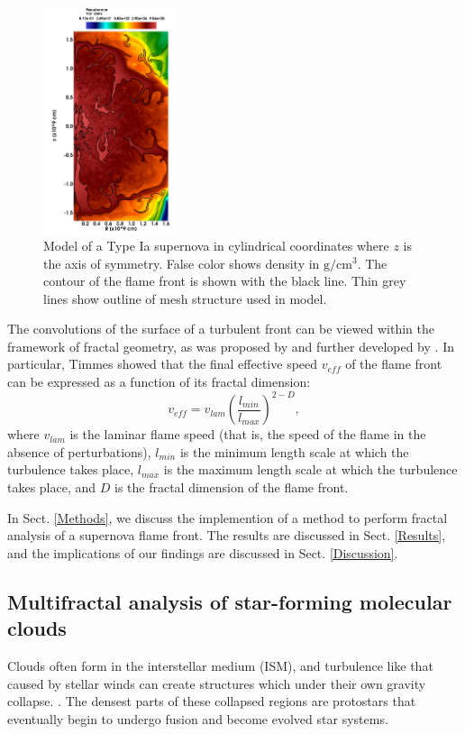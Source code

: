 \documentclass[iop]{emulateapj}
\begin{document}
\begin{figure}[ht]
	\begin{center}
	\includegraphics[width=0.35\textwidth,clip=true]{Graphics/n7d1r10t15b0011_cropped.png}
	\caption{Model of a Type Ia supernova in cylindrical coordinates where $z$ is the axis of symmetry. False color shows density in $\mathrm{g/cm^3}$. The contour of the flame front is shown with the black line. Thin grey lines show outline of mesh structure used in model.
	\label{f:flamefrontwithcontour}}
	\end{center}
	\end{figure} 

The convolutions of the surface of a turbulent front can be viewed within the framework of fractal geometry, as was proposed by \cite{Mandelbrot1975} and further developed by \cite{Timmes1994}. In particular, Timmes showed that the final effective speed $v_{eff}$ of the flame front can be expressed as a function of its fractal dimension:
\begin{equation} 
	v_{eff} = v_{lam} \left(\frac{l_{min}}{l_{max}}\right)^{2 - D},
\end{equation}
where $v_{lam}$ is the laminar flame speed (that is, the speed of the flame in the absence of perturbations), $l_{min}$ is the minimum length scale at which the turbulence takes place, $l_{max}$ is the maximum length scale at which the turbulence takes place, and $ D $ is the fractal dimension of the flame front.

In Sect. \ref{Methods}, we discuss the implemention of a method to perform fractal analysis of a supernova flame front. The results are discussed in Sect. \ref{Results}, and the implications of our findings are discussed in Sect. \ref{Discussion}.

\subsection{Multifractal analysis of star-forming molecular clouds}
Clouds often form in the interstellar medium (ISM), and turbulence like that caused by stellar winds can create structures which under their own gravity collapse. \citep{Bergin2007}. The densest parts of these collapsed regions are protostars that eventually begin to undergo fusion and become evolved star systems. 
\end{document}
